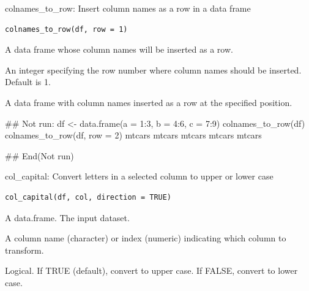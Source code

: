 \documentclass[a4paper]{book}
\begin{document}
%
\begin{Description}
colnames\_to\_row: Insert column names as a row in a data frame
\end{Description}
%
\begin{Usage}
\begin{verbatim}
colnames_to_row(df, row = 1)
\end{verbatim}
\end{Usage}
%
\begin{Arguments}
\begin{ldescription}
\item[\code{df}] A data frame whose column names will be inserted as a row.

\item[\code{row}] An integer specifying the row number where column names should be inserted. Default is 1.
\end{ldescription}
\end{Arguments}
%
\begin{Value}
A data frame with column names inserted as a row at the specified position.
\end{Value}
%
\begin{Examples}
\begin{ExampleCode}
\#\# Not run: 
df <- data.frame(a = 1:3, b = 4:6, c = 7:9)
colnames_to_row(df)
colnames_to_row(df, row = 2)
mtcars
mtcars %
mtcars %
mtcars %
mtcars %

## End(Not run)
\end{ExampleCode}
\end{Examples}
%
\begin{Description}
col\_capital: Convert letters in a selected column to upper or lower case
\end{Description}
%
\begin{Usage}
\begin{verbatim}
col_capital(df, col, direction = TRUE)
\end{verbatim}
\end{Usage}
%
\begin{Arguments}
\begin{ldescription}
\item[\code{df}] A data.frame. The input dataset.

\item[\code{col}] A column name (character) or index (numeric) indicating which column to transform.

\item[\code{direction}] Logical. If TRUE (default), convert to upper case. If FALSE, convert to lower case.
\end{ldescription}
\end{Arguments}
\end{document}

